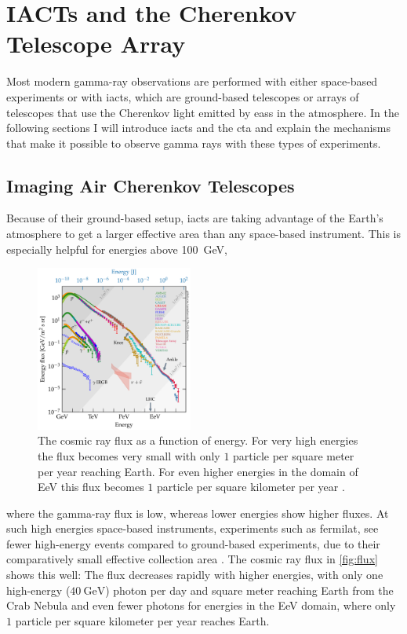 \chapter{IACTs and the Cherenkov Telescope Array}

Most modern gamma-ray observations are performed with either space-based experiments or with
\glspl{iact}, which are ground-based telescopes or arrays of telescopes that use the Cherenkov light
emitted by \glspl{eas} in the atmosphere. In the following sections I will introduce \glspl{iact} and
the \gls{cta} and explain the mechanisms that make it possible to observe gamma rays with these types
of experiments.


\section{Imaging Air Cherenkov Telescopes}
\label{sec:iact}

Because of their ground-based setup, \glspl{iact} are taking advantage of the Earth's atmosphere to get a
larger effective area than any space-based instrument. This is especially helpful for energies above
\SI{100}{\giga\eV},
\begin{figure}
    \centering
    \vspace*{-0.5cm}
    \includegraphics[width=0.46\textwidth]{graphics/cr_spectrum.pdf}
    \caption{The cosmic ray flux as a function of energy. For very high energies the flux becomes very
    small with only \(\num{1}\) particle per square meter per year reaching Earth. For even higher
    energies in the domain of \si{\exa\eV} this flux becomes \(\num{1}\) particle per square
    kilometer per year \cite{carmelo_2020}.}
    \label{fig:flux}
\end{figure}
where the gamma-ray flux is low, whereas lower energies show higher fluxes. At such high energies
space-based instruments, experiments such as \gls{fermilat}, see fewer high-energy events compared
to ground-based experiments, due to their comparatively small effective collection area \cite[p.~256]{funk}.
The cosmic ray flux in \autoref{fig:flux} shows this well: The flux decreases rapidly with higher
energies, with only one high-energy (\greater\(\SI{40}{\giga\eV}\)) photon per day and square meter
reaching Earth from the Crab Nebula \cite{noethe_thesis} and even fewer photons for energies in the
\si{\exa\eV} domain, where only \(\num{1}\) particle per square kilometer per year reaches Earth.

